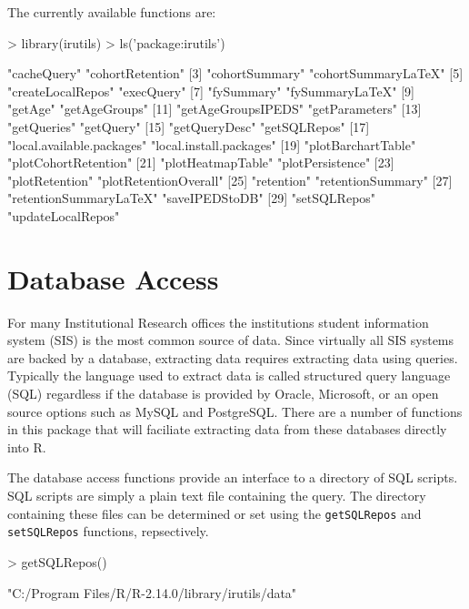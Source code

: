 \documentclass[letterpaper,11pt]{article}
\begin{document}
The currently available functions are:
\begin{Schunk}
\begin{Sinput}
> library(irutils)
> ls('package:irutils')
\end{Sinput}
\begin{Soutput}
 [1] "cacheQuery"               "cohortRetention"         
 [3] "cohortSummary"            "cohortSummaryLaTeX"      
 [5] "createLocalRepos"         "execQuery"               
 [7] "fySummary"                "fySummaryLaTeX"          
 [9] "getAge"                   "getAgeGroups"            
[11] "getAgeGroupsIPEDS"        "getParameters"           
[13] "getQueries"               "getQuery"                
[15] "getQueryDesc"             "getSQLRepos"             
[17] "local.available.packages" "local.install.packages"  
[19] "plotBarchartTable"        "plotCohortRetention"     
[21] "plotHeatmapTable"         "plotPersistence"         
[23] "plotRetention"            "plotRetentionOverall"    
[25] "retention"                "retentionSummary"        
[27] "retentionSummaryLaTeX"    "saveIPEDStoDB"           
[29] "setSQLRepos"              "updateLocalRepos"        
\end{Soutput}
\end{Schunk}



\section{Database Access}

For many Institutional Research offices the institutions student information system (SIS) is the most common source of data. Since virtually all SIS systems are backed by a database, extracting data requires extracting data using queries. Typically the language used to extract data is called structured query language (SQL) regardless if the database is provided by Oracle, Microsoft, or an open source options such as MySQL and PostgreSQL. There are a number of functions in this package that will faciliate extracting data from these databases directly into R.

The database access functions provide an interface to a directory of SQL scripts. SQL scripts are simply a plain text file containing the query. The directory containing these files can be determined or set using the \texttt{getSQLRepos} and \texttt{setSQLRepos} functions, repsectively. 

\begin{Schunk}
\begin{Sinput}
> getSQLRepos()
\end{Sinput}
\begin{Soutput}
[1] "C:/Program Files/R/R-2.14.0/library/irutils/data"
\end{Soutput}
\end{Schunk}
\end{document}
